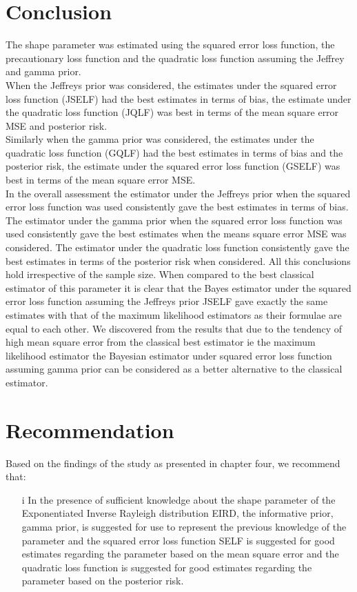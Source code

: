 \documentclass[a4paper,12pt]{report}
\newcommand{\para}{\hspace{0.5cm}}
\begin{document}
{\section{Conclusion}
\noindent\para The shape parameter was estimated using the squared error loss function, the precautionary loss function and the quadratic loss function assuming the Jeffrey and gamma prior.\\

\noindent\para When the Jeffreys prior was considered, the estimates under the squared error loss function (JSELF) had the best estimates in terms of bias, the estimate under the quadratic loss function (JQLF) was best in terms of the mean square error MSE and posterior risk.\\

\noindent\para Similarly when the gamma prior was considered, the estimates under the quadratic loss function (GQLF) had the best estimates in terms of bias and the posterior risk, the estimate under the  squared error loss function (GSELF) was best in terms of the mean square error MSE.\\

\noindent\para In the overall assessment the estimator under the Jeffreys prior when the squared error loss function was used consistently gave the best estimates in terms of bias. The estimator under the gamma prior when the squared error loss function was used consistently gave the best estimates when the means square error MSE was considered. The estimator under the quadratic loss function consistently gave the best estimates in terms of the posterior risk when considered. All this conclusions hold irrespective of the sample size. When compared to the best classical estimator of this parameter it is clear that the Bayes estimator under the squared error loss function assuming the Jeffreys prior JSELF gave exactly the same estimates with that of the maximum likelihood estimators as their formulae are equal to each other. We discovered from the results that due to the tendency of high mean square error from the classical best estimator ie the maximum likelihood estimator the Bayesian estimator under squared error loss function assuming gamma prior can be considered as a better alternative to the classical estimator.

\section{Recommendation}
Based on the findings of the study as presented in chapter four, we recommend that:
\begin{itemize}
	\item[i] In the presence of sufficient knowledge about the shape parameter of the Exponentiated Inverse Rayleigh distribution EIRD, the informative prior, gamma prior, is suggested for use to represent the previous knowledge of the parameter and the squared error loss function SELF is suggested for good estimates regarding the parameter based on the mean square error and the quadratic loss function is suggested for good estimates regarding the parameter based on the posterior risk.
	

\end{itemize}}
\end{document}
